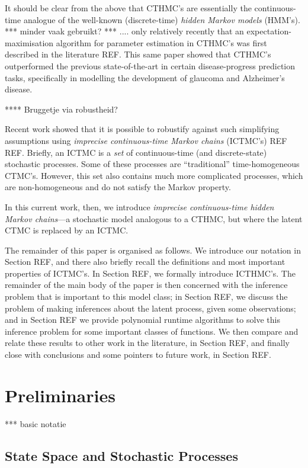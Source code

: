 \documentclass[twoside,11pt]{article}
\begin{document}
It should be clear from the above that CTHMC's are essentially the continuous-time analogue of the well-known (discrete-time) \emph{hidden Markov models} (HMM's). *** minder vaak gebruikt? *** .... only relatively recently that an expectation-maximisation algorithm for parameter estimation in CTHMC's was first described in the literature REF. This same paper showed that CTHMC's outperformed the previous state-of-the-art in certain disease-progress prediction tasks, specifically in modelling the development of glaucoma and Alzheimer's disease.

**** Bruggetje via robustheid?

Recent work showed that it is possible to robustify against such simplifying assumptions using \emph{imprecise continuous-time Markov chains} (ICTMC's) REF REF. Briefly, an ICTMC is a \emph{set} of continuous-time (and discrete-state) stochastic processes. Some of these processes are ``traditional'' time-homogeneous CTMC's. However, this set also contains much more complicated processes, which are non-homogeneous and do not satisfy the Markov property.

In this current work, then, we introduce \emph{imprecise continuous-time hidden Markov chains}---a stochastic model analogous to a CTHMC, but where the latent CTMC is replaced by an ICTMC.

The remainder of this paper is organised as follows. We introduce our notation in Section REF, and there also briefly recall the definitions and most important properties of ICTMC's. In Section REF, we formally introduce ICTHMC's. The remainder of the main body of the paper is then concerned with the inference problem that is important to this model class; in Section REF, we discuss the problem of making inferences about the latent process, given some observations; and in Section REF we provide polynomial runtime algorithms to solve this inference problem for some important classes of functions. We then compare and relate these results to other work in the literature, in Section REF, and finally close with conclusions and some pointers to future work, in Section REF.

\section{Preliminaries}

*** basic notatie

\subsection{State Space and Stochastic Processes}
\end{document}

